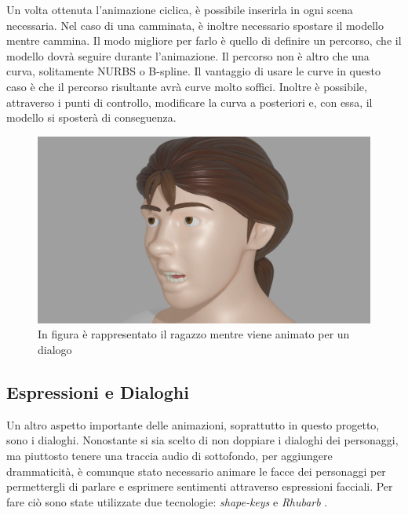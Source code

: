Un volta ottenuta l'animazione ciclica, è possibile inserirla in ogni scena necessaria.
Nel caso di una camminata, è inoltre necessario spostare il modello mentre cammina.
Il modo migliore per farlo è quello di definire un percorso, che il modello dovrà seguire durante l'animazione.
Il percorso non è altro che una curva, solitamente NURBS o B-spline.
Il vantaggio di usare le curve in questo caso è che il percorso risultante avrà curve molto soffici.
Inoltre è possibile, attraverso i punti di controllo, modificare la curva a posteriori e, con essa, il modello si sposterà di conseguenza.

\begin{figure}
\centering
\includegraphics[width=\textwidth]{Figures/screen7}
\decoRule
\caption[Animazione dialoghi]{In figura è rappresentato il ragazzo mentre viene animato per un dialogo}
\label{fig:dialog}
\end{figure}
\subsection{Espressioni e Dialoghi}
Un altro aspetto importante delle animazioni, soprattutto in questo progetto, sono i dialoghi.
Nonostante si sia scelto di non doppiare i dialoghi dei personaggi, ma piuttosto tenere una traccia audio di sottofondo, per aggiungere drammaticità, è comunque stato necessario animare le facce dei personaggi per permettergli di parlare e esprimere sentimenti attraverso espressioni facciali.
Per fare ciò sono state utilizzate due tecnologie: \emph{shape-keys} \cite{blendDoc} e \emph{Rhubarb} \cite{blendRhubarb}.

